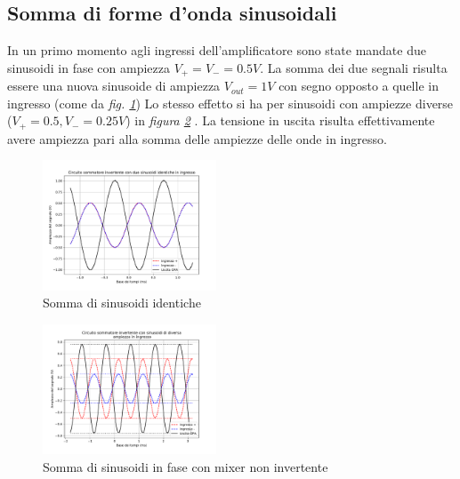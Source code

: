 \documentclass[journal]{IEEEtran}
\begin{document}
\vspace{-10mm}


\subsection{\textbf{Somma di forme d'onda sinusoidali}}
In un primo momento agli ingressi dell'amplificatore sono state mandate due sinusoidi in fase con ampiezza $V_+ = V_- = 0.5 V$. La somma dei due segnali risulta essere una nuova sinusoide di ampiezza $V_{out} = 1 V$ con segno opposto a quelle in ingresso (come da \textit{fig. \ref{fig:Mixer1}})
Lo stesso effetto si ha per sinusoidi con ampiezze diverse ($V_+ = 0.5, V_- = 0.25 V$) in \textit{figura \ref{fig:Mixer3} }. La tensione in uscita risulta effettivamente avere ampiezza pari alla somma delle ampiezze delle onde in ingresso.

\begin{figure}[H]%
\begin{center}
\includegraphics[width=0.46\textwidth]{analysis/output/OPA_mixer_sin0.pdf}
\caption{Somma di sinusoidi identiche}
\label{fig:Mixer1}
\end{center}
\end{figure}

\begin{figure}[H]%
\begin{center}
\includegraphics[width=0.46\textwidth]{analysis/output/OPA_mixer_sin3.pdf}
\caption{Somma di sinusoidi in fase con mixer non invertente}
\label{fig:Mixer3}
\end{center}
\end{figure}
\end{document}
